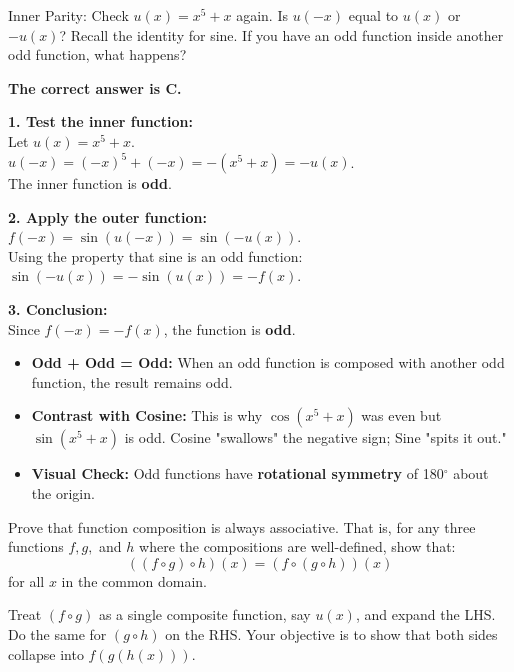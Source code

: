 \begin{hint}
Inner Parity: Check $u(x) = x^5 + x$ again. Is $u(-x)$ equal to $u(x)$ or $-u(x)$? Recall the identity for sine. If you have an odd function inside another odd function, what happens?
\end{hint}

\begin{solution}
\textbf{The correct answer is C.}

\textbf{1. Test the inner function:} \\
Let $u(x) = x^5 + x$. \\
$u(-x) = (-x)^5 + (-x) = -(x^5 + x) = -u(x)$. \\
The inner function is \textbf{odd}.

\textbf{2. Apply the outer function:} \\
$f(-x) = \sin(u(-x)) = \sin(-u(x))$. \\
Using the property that sine is an odd function: \\
$\sin(-u(x)) = -\sin(u(x)) = -f(x)$.

\textbf{3. Conclusion:} \\
Since $f(-x) = -f(x)$, the function is \textbf{odd}.
\end{solution}

\begin{takeaways}
\begin{itemize}[leftmargin=*]
\item \textbf{Odd + Odd = Odd:} When an odd function is composed with another odd function, the result remains odd.
\item \textbf{Contrast with Cosine:} This is why $\cos(x^5+x)$ was even but $\sin(x^5+x)$ is odd. Cosine "swallows" the negative sign; Sine "spits it out."
\item \textbf{Visual Check:} Odd functions have \textbf{rotational symmetry} of 180$^\circ$ about the origin.
\end{itemize}
\end{takeaways}

\begin{problem}
Prove that function composition is always associative. That is, for any three functions $f, g,$ and $h$ where the compositions are well-defined, show that:
\[ ((f \circ g) \circ h)(x) = (f \circ (g \circ h))(x) \]
for all $x$ in the common domain.
\end{problem}

\begin{hint}
Treat $(f \circ g)$ as a single composite function, say $u(x)$, and expand the LHS. Do the same for $(g \circ h)$ on the RHS. Your objective is to show that both sides collapse into $f(g(h(x)))$.
\end{hint}

